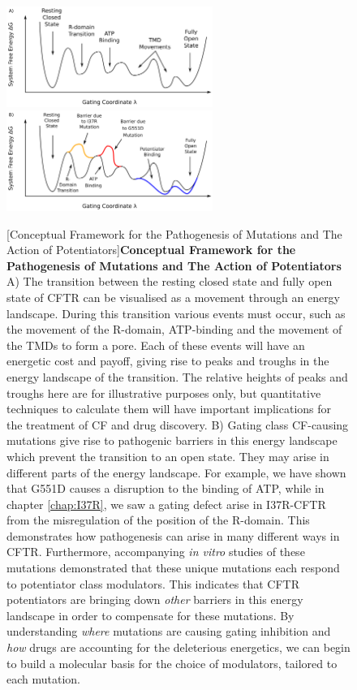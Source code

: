 \begin{figure}
	\begin{center}
		\begingroup
	\includegraphics[width=0.6\textwidth]{figures/perspective/drug_landscape_1.pdf}\\
	\includegraphics[width=0.6\textwidth]{figures/perspective/drug_landscape_3.pdf}\\
		\endgroup
	\end{center}
	\begingroup
	\captionsetup{singlelinecheck = false, justification=raggedright}
	[Conceptual Framework for the Pathogenesis of Mutations and The Action of Potentiators]{\textbf{Conceptual Framework for the Pathogenesis of Mutations and The Action of Potentiators}{ A) The transition between the resting closed state and fully open state of CFTR can be visualised as a movement through an energy landscape. During this transition various events must occur, such as the movement of the R-domain, ATP-binding and the movement of the TMDs to form a pore. Each of these events will have an energetic cost and payoff, giving rise to peaks and troughs in the energy landscape of the transition. The relative heights of peaks and troughs here are for illustrative purposes only, but quantitative techniques to calculate them will have important implications for the treatment of CF and drug discovery. B) Gating class CF-causing mutations give rise to pathogenic barriers in this energy landscape which prevent the transition to an open state. They may arise in different parts of the energy landscape. For example, we have shown that G551D causes a disruption to the binding of ATP, while in chapter \ref{chap:I37R}, we saw a gating defect arise in I37R-CFTR from the misregulation of the position of the R-domain. This demonstrates how pathogenesis can arise in many different ways in CFTR. Furthermore, accompanying \textit{in vitro} studies of these mutations demonstrated that these unique mutations each respond to potentiator class modulators. This indicates that CFTR potentiators are bringing down \textit{other} barriers in this energy landscape in order to compensate for these mutations. By understanding \textit{where} mutations are causing gating inhibition and \textit{how} drugs are accounting for the deleterious energetics, we can begin to build a molecular basis for the choice of modulators, tailored to each mutation.}}
	\label{drug_action_model}

	\endgroup
\end{figure}

